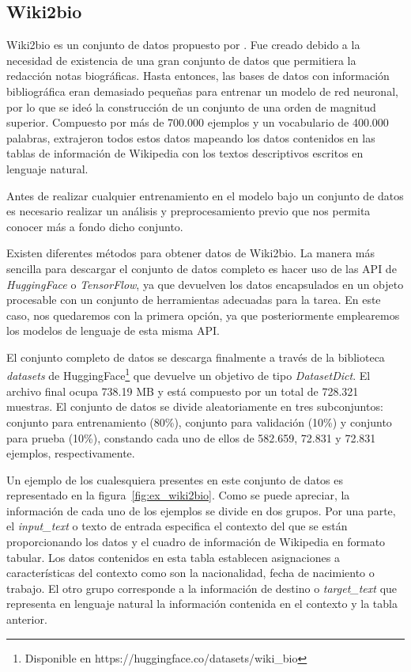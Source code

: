 \subsection{Wiki2bio}

Wiki2bio es un conjunto de datos propuesto por \citep{lebret-etal-2016-neural}. Fue creado debido a la necesidad de existencia de una gran conjunto de datos que permitiera la redacción notas biográficas. Hasta entonces, las bases de datos con información bibliográfica eran demasiado pequeñas para entrenar un modelo de red neuronal, por lo que se ideó la construcción de un conjunto de una orden de magnitud superior. Compuesto por más de 700.000 ejemplos y un vocabulario de 400.000 palabras, extrajeron todos estos datos mapeando los datos contenidos en las tablas de información de Wikipedia con los textos descriptivos escritos en lenguaje natural.

Antes de realizar cualquier entrenamiento en el modelo bajo un conjunto de datos es necesario realizar un análisis y preprocesamiento previo que nos permita conocer más a fondo dicho conjunto. 

Existen diferentes métodos para obtener datos de Wiki2bio. La manera más sencilla para descargar el conjunto de datos completo es hacer uso de las API de \textit{HuggingFace} o \textit{TensorFlow}, ya que devuelven los datos encapsulados en un objeto procesable con un conjunto de herramientas adecuadas para la tarea. En este caso, nos quedaremos con la primera opción, ya que posteriormente emplearemos los modelos de lenguaje de esta misma API. 

El conjunto completo de datos se descarga finalmente a través de la biblioteca \textit{datasets} de HuggingFace\footnote{Disponible en https://huggingface.co/datasets/wiki\_bio} que devuelve un objetivo de tipo \textit{DatasetDict}. El archivo final ocupa 738.19 MB y está compuesto por un total de 728.321 muestras.
El conjunto de datos se divide aleatoriamente en tres subconjuntos: conjunto para entrenamiento (80\%), conjunto para validación (10\%) y conjunto para prueba (10\%), constando cada uno de ellos de 582.659, 72.831 y 72.831 ejemplos, respectivamente.

Un ejemplo de los cualesquiera presentes en este conjunto de datos es representado en la figura~\ref{fig:ex_wiki2bio}. Como se puede apreciar, la información de cada uno de los ejemplos se divide en dos grupos. Por una parte, el \textit{input\_text} o texto de entrada especifica el contexto del que se están proporcionando los datos y el cuadro de información de Wikipedia en formato tabular. Los datos contenidos en esta tabla establecen asignaciones a características del contexto como son la nacionalidad, fecha de nacimiento o trabajo. El otro grupo corresponde a la información de destino o \textit{target\_text} que representa en lenguaje natural la información contenida en el contexto y la tabla anterior.

